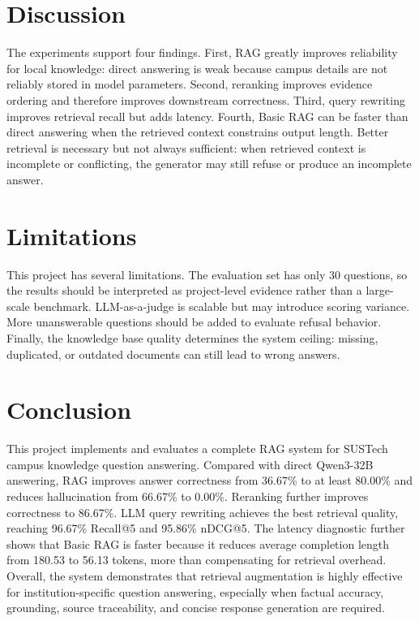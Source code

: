 \section{Discussion}

The experiments support four findings. First, RAG greatly improves reliability for local knowledge: direct answering is weak because campus details are not reliably stored in model parameters. Second, reranking improves evidence ordering and therefore improves downstream correctness. Third, query rewriting improves retrieval recall but adds latency. Fourth, Basic RAG can be faster than direct answering when the retrieved context constrains output length. Better retrieval is necessary but not always sufficient: when retrieved context is incomplete or conflicting, the generator may still refuse or produce an incomplete answer.

\section{Limitations}

This project has several limitations. The evaluation set has only 30 questions, so the results should be interpreted as project-level evidence rather than a large-scale benchmark. LLM-as-a-judge is scalable but may introduce scoring variance. More unanswerable questions should be added to evaluate refusal behavior. Finally, the knowledge base quality determines the system ceiling: missing, duplicated, or outdated documents can still lead to wrong answers.

\section{Conclusion}

This project implements and evaluates a complete RAG system for SUSTech campus knowledge question answering. Compared with direct Qwen3-32B answering, RAG improves answer correctness from 36.67\% to at least 80.00\% and reduces hallucination from 66.67\% to 0.00\%. Reranking further improves correctness to 86.67\%. LLM query rewriting achieves the best retrieval quality, reaching 96.67\% Recall@5 and 95.86\% nDCG@5. The latency diagnostic further shows that Basic RAG is faster because it reduces average completion length from 180.53 to 56.13 tokens, more than compensating for retrieval overhead. Overall, the system demonstrates that retrieval augmentation is highly effective for institution-specific question answering, especially when factual accuracy, grounding, source traceability, and concise response generation are required.





